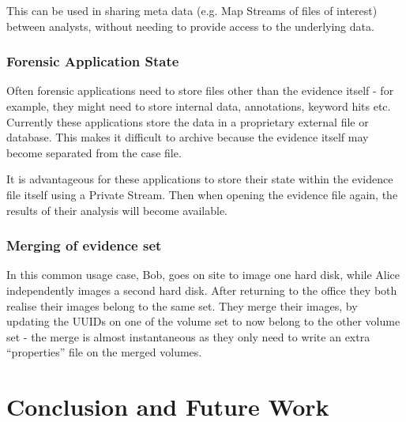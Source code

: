 \documentclass[10pt, conference]{IEEEtran}
\begin{document}
This can be used in sharing meta data (e.g. Map Streams of files of
interest) between analysts, without needing to provide access to the
underlying data.

\subsubsection{Forensic Application State}
Often forensic applications need to store files other than the
evidence itself - for example, they might need to store internal data,
annotations, keyword hits etc. Currently these applications store the
data in a proprietary external file or database. This makes it
difficult to archive because the evidence itself may become separated
from the case file.

It is advantageous for these applications to store their state within
the evidence file itself using a Private Stream. Then when opening the
evidence file again, the results of their analysis will become
available.

\subsubsection{Merging of evidence set}
In this common usage case, Bob, goes on site to image one hard disk,
while Alice independently images a second hard disk. After returning
to the office they both realise their images belong to the same
set. They merge their images, by updating the UUIDs on one of the
volume set to now belong to the other volume set - the merge is almost
instantaneous as they only need to write an extra ``properties'' file
on the merged volumes.

\section{Conclusion and Future Work}


\end{document}
